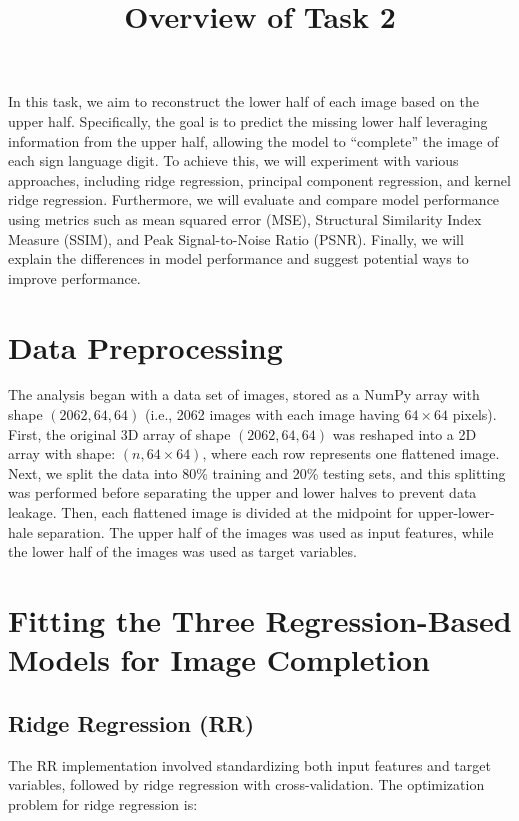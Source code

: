 \documentclass{article}
\begin{document}
    \title{Overview of Task 2}
    \maketitle
    In this task, we aim to reconstruct the lower half of each image based on the upper half. Specifically, the goal is to predict the missing lower half leveraging information from the upper half, allowing the model to “complete” the image of each sign language digit. To achieve this, we will experiment with various approaches, including ridge regression, principal component regression, and kernel ridge regression. Furthermore, we will evaluate and compare model performance using metrics such as mean squared error (MSE), Structural Similarity Index Measure (SSIM), and Peak Signal-to-Noise Ratio (PSNR). Finally, we will explain the differences in model performance and suggest potential ways to improve performance. 

    \section{Data Preprocessing}
    The analysis began with a data set of images, stored as a NumPy array with shape $(2062, 64, 64)$ (i.e., 2062 images with each image having $64 \times 64$ pixels). First, the original 3D array of shape $(2062, 64, 64)$ was reshaped into a 2D array with shape: $(n, 64 \times 64)$, where each row represents one flattened image. Next, we split the data into 80\% training and 20\% testing sets, and this splitting was performed before separating the upper and lower halves to prevent data leakage. Then, each flattened image is divided at the midpoint for upper-lower-hale separation. The upper half of the images was used as input features, while the lower half of the images was used as target variables.

    \section{Fitting the Three Regression-Based Models for Image Completion}
        \subsection{Ridge Regression (RR)}
        The RR implementation involved standardizing both input features and target variables, followed by ridge regression with cross-validation. The optimization problem for ridge regression is:
        
\end{document}
